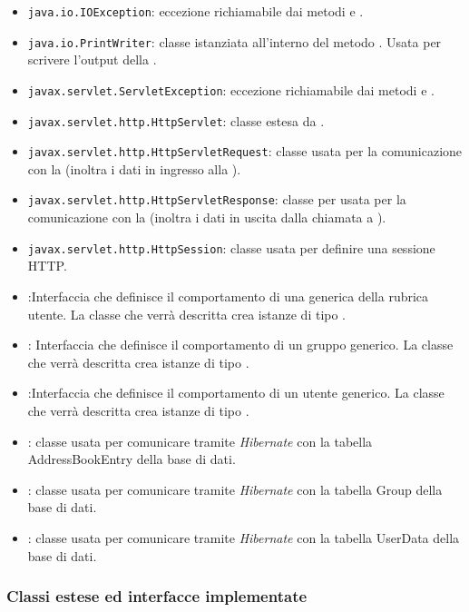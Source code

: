 \begin{itemize}
	\item \texttt{java.io.IOException}: eccezione richiamabile dai metodi  e .
	\item \texttt{java.io.PrintWriter}: classe istanziata all'interno del metodo . Usata per scrivere l'output della .
	\item \texttt{javax.servlet.ServletException}: eccezione richiamabile dai metodi  e .
	\item \texttt{javax.servlet.http.HttpServlet}: classe estesa da .
	\item \texttt{javax.servlet.http.HttpServletRequest}:  classe usata per la comunicazione con la  (inoltra i dati in ingresso alla ).
	\item \texttt{javax.servlet.http.HttpServletResponse}: classe per usata per la comunicazione con la  (inoltra i dati in uscita dalla chiamata a ).
	\item \texttt{javax.servlet.http.HttpSession}: classe usata per definire una sessione HTTP.
	\item {}:Interfaccia che definisce il comportamento di una generica  della rubrica utente. La classe che verrà descritta crea istanze di tipo .
	\item {}:
Interfaccia che definisce il comportamento di un gruppo generico. La classe che verrà descritta crea istanze di tipo .
	\item {}:Interfaccia che definisce il comportamento di un utente generico. La classe che verrà descritta crea istanze di tipo .
	\item {}: classe usata per comunicare tramite \textit{Hibernate} con la tabella AddressBookEntry della base di dati.
	\item {}: classe usata per comunicare tramite \textit{Hibernate} con la tabella Group della base di dati.
	\item {}: classe usata per comunicare tramite \textit{Hibernate} con la tabella UserData della base di dati.
\end{itemize}

\subsubsection*{Classi estese ed interfacce implementate}

